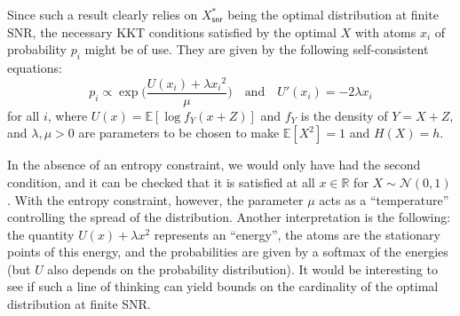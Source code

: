 \documentclass[11pt]{article}
\newcommand{\calN}{\mathcal{N}}
\newcommand{\snr}{\mathsf{snr}}
\newcommand{\bbE}{\mathbb{E}}
\newcommand{\bbR}{\mathbb{R}}
\begin{document}
	Since such a result clearly relies on $X^*_\snr$ being the optimal distribution at finite SNR,  the necessary KKT conditions satisfied by the optimal $X$ with atoms $x_i$ of probability $p_i$ might be of use.  They are given by the following self-consistent equations:
	\begin{equation*}
		p_i \propto \exp\Big(\frac{U(x_i) + \lambda {x_i}^2}{\mu}\Big) \quad \text{and} \quad U'(x_i) = -2\lambda x_i
	\end{equation*}
	for all $i$, where $U(x) = \bbE[\log f_Y(x + Z)]$ and $f_Y$ is the density of $Y = X + Z$, and $\lambda,\mu > 0$ are parameters to be chosen to make $\bbE[X^2] = 1$ and $H(X) = h$.
	
	In the absence of an entropy constraint, we would only have had the second condition, and it can be checked that it is satisfied at all $x \in \bbR$ for $X \sim \calN(0,1)$.  With the entropy constraint, however, the parameter $\mu$ acts as a ``temperature'' controlling the spread of the distribution.  Another interpretation is the following: the quantity $U(x) + \lambda x^2$ represents an ``energy'', the atoms are the stationary points of this energy, and the probabilities are given by a softmax of the energies (but $U$ also depends on the probability distribution).  It would be interesting to see if such a line of thinking can yield bounds on the cardinality of the optimal distribution at finite SNR.
	
	
	
	\printbibliography
	
\end{document}
